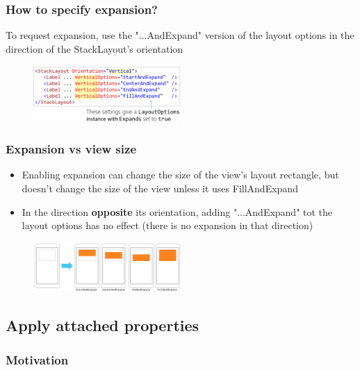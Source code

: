 \documentclass{article}
\newcommand{\bold}[1]{\textbf{#1}}
\begin{document}
\subsubsection{How to specify expansion?}

To request expansion, use the "...AndExpand" version of the layout options in the direction of the StackLayout's orientation

\begin{figure}[H]
    \centering
    \includegraphics[width=0.5\textwidth]{xaml-expansion-specify.png}
    \caption{}
\end{figure}

\subsubsection{Expansion vs view size}

\begin{itemize}
    \item Enabling expansion can change the size of the view's layout rectangle, but doesn't change the size of the view unless it uses FillAndExpand
    \item In the direction \bold{opposite} its orientation, adding "...AndExpand" tot the layout options has no effect (there is no expansion in that direction)
\end{itemize}

\begin{figure}[H]
    \centering
    \includegraphics[width=0.5\textwidth]{xaml-expansion-viewsize.png}
    \caption{}
\end{figure}

\subsection{Apply attached properties}

\subsubsection{Motivation}
\end{document}
